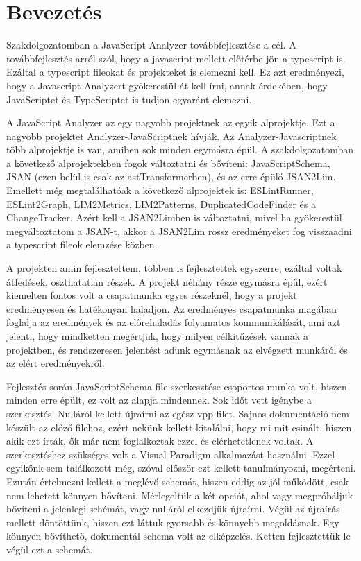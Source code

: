 \chapter{Bevezetés}

\noindent

Szakdolgozatomban a JavaScript Analyzer továbbfejlesztése a cél.
A továbbfejlesztés arról szól, hogy a javascript mellett előtérbe jön a typescript is.
Ezáltal a typescript fileokat és projekteket is elemezni kell.
Ez azt eredményezi, hogy a Javascript Analyzert gyökerestül át kell írni, annak érdekében,
hogy JavaScriptet és TypeScriptet is tudjon egyaránt elemezni.

\noindent

A JavaScript Analyzer az egy nagyobb projektnek az egyik alprojektje. Ezt a nagyobb projektet Analyzer-JavaScriptnek hívják.
Az Analyzer-Javascriptnek több alprojektje is van, amiben sok minden egymásra épül.
A szakdolgozatomban a következő alprojektekben fogok változtatni és bővíteni: JavaScriptSchema, JSAN (ezen belül is csak az astTransformerben), és az erre épülő JSAN2Lim.
Emellett még megtalálhatóak a következő alprojektek is: ESLintRunner, ESLint2Graph, LIM2Metrics, LIM2Patterns, DuplicatedCodeFinder és a ChangeTracker.
Azért kell a JSAN2Limben is változtatni, mivel ha gyökerestül megváltoztatom a JSAN-t,
akkor a JSAN2Lim rossz eredményeket fog visszaadni a typescript fileok elemzése közben.

\noindent

A projekten amin fejlesztettem, többen is fejlesztettek egyszerre, ezáltal voltak átfedések, oszthatatlan részek.
A projekt néhány része egymásra épül, ezért kiemelten fontos volt a csapatmunka egyes részeknél, hogy a projekt eredményesen és hatékonyan haladjon.
Az eredményes csapatmunka magában foglalja az eredmények és az előrehaladás folyamatos kommunikálását,
ami azt jelenti, hogy mindketten megértjük, hogy milyen célkitűzések vannak a projektben,
és rendszeresen jelentést adunk egymásnak az elvégzett munkáról és az elért eredményekről.

\noindent

Fejlesztés során JavaScriptSchema file szerkesztése csoportos munka volt, hiszen minden erre épült, ez volt az alapja mindennek.
Sok időt vett igénybe a szerkesztés. Nulláról kellett újraírni az egész vpp filet.
Sajnos dokumentáció nem készült az előző filehoz, ezért nekünk kellett kitalálni, hogy mi mit csinált, hiszen akik ezt írták, ők már nem foglalkoztak ezzel és elérhetetlenek voltak.
A szerkesztéshez szükséges volt a Visual Paradigm alkalmazást használni.
Ezzel egyikőnk sem találkozott még, szóval először ezt kellett tanulmányozni, megérteni.
Ezután értelmezni kellett a meglévő schemát, hiszen eddig az jól működött, csak nem lehetett könnyen bővíteni.
Mérlegeltük a két opciót, ahol vagy megpróbáljuk bővíteni a jelenlegi schémát, vagy nulláról elkezdjük újraírni.
Végül az újraírás mellett döntöttünk, hiszen ezt láttuk gyorsabb és könnyebb megoldásnak. Egy könnyen bővíthető, dokumentál schema volt az elképzelés.
Ketten fejlesztettük le végül ezt a schemát.

